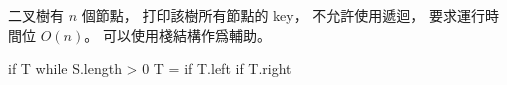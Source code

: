\startEXERCISE
二叉樹有 $n$ 個節點，
打印該樹所有節點的 key，
不允許使用遞迴，
要求運行時間位 $O(n)$。
可以使用棧結構作爲輔助。
\stopEXERCISE

\startCLRSCODE
if T
while S.length > 0
	T = 
	if T.left
	if T.right
\stopCLRSCODE
